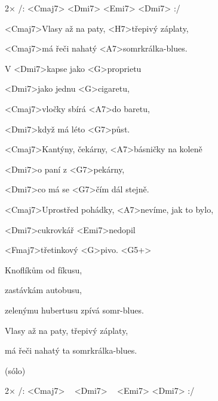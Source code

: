 

2× /: <Cmaj7> <Dmi7> <Emi7> <Dmi7> :/

\zs
<Cmaj7>Vlasy až na paty, <H7>třepivý záplaty,

<Cmaj7>má řeči nahatý <A7>somrkrálka-blues.

V <Dmi7>kapse jako <G>proprietu 

<Dmi7>jako jednu <G>cigaretu, 

<Cmaj7>vločky sbírá <A7>do baretu, 

<Dmi7>když má léto <G7>půst. 

\ks

\zr
<Cmaj7>Kantýny, čekárny, <A7>básničky na koleně 

<Dmi7>o paní z <G7>pekárny, 

<Dmi7>co má se <G7>čím dál stejně.

<Cmaj7>Uprostřed pohádky, <A7>nevíme, jak to bylo,

<Dmi7>cukrovkář <Emi7>nedopil 

<Fmaj7>třetinkový <G>pivo. <G5+>
\kr

\zs
Knoflíkům od fíkusu,

zastávkám autobusu,

zelenýmu hubertusu zpívá somr-blues.

Vlasy až na paty, třepivý záplaty,

má řeči nahatý ta somrkrálka-blues.
\ks

\zr \kr

\zs
(sólo)
\ks

\zr \kr

2× /: <Cmaj7> ~ <Dmi7> ~ <Emi7> <Dmi7> :/

\kp
